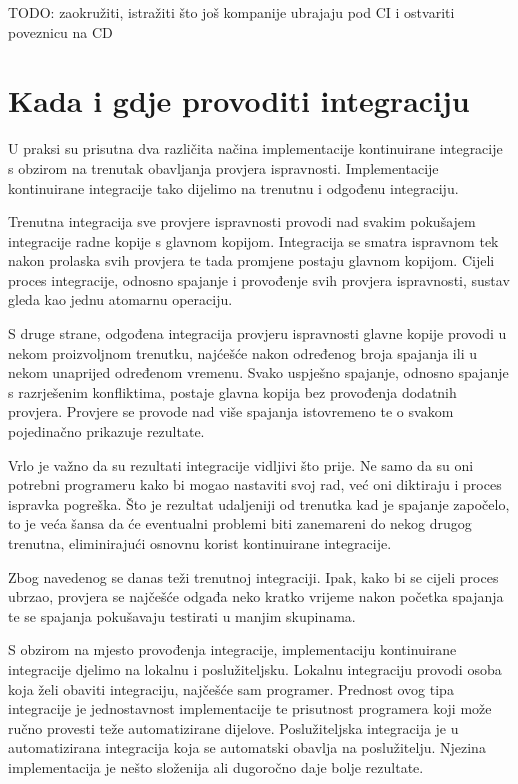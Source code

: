 \documentclass[times, utf8, seminar, numeric]{fer}
\begin{document}
TODO: zaokružiti, istražiti što još kompanije ubrajaju pod CI i ostvariti poveznicu na CD

\section{Kada i gdje provoditi integraciju}
U praksi su prisutna dva različita načina implementacije kontinuirane integracije s obzirom na trenutak obavljanja provjera ispravnosti. Implementacije kontinuirane integracije tako dijelimo na trenutnu i odgođenu integraciju.

Trenutna integracija sve provjere ispravnosti provodi nad svakim pokušajem integracije radne kopije s glavnom kopijom. Integracija se smatra ispravnom tek nakon prolaska svih provjera te tada promjene postaju glavnom kopijom. Cijeli proces integracije, odnosno spajanje i provođenje svih provjera ispravnosti, sustav gleda kao jednu atomarnu operaciju. 

S druge strane, odgođena integracija provjeru ispravnosti glavne kopije provodi u nekom proizvoljnom trenutku, najćešće nakon određenog broja spajanja ili u nekom unaprijed određenom vremenu. Svako uspješno spajanje, odnosno spajanje s razrješenim konfliktima, postaje glavna kopija bez provođenja dodatnih provjera. Provjere se provode nad više spajanja istovremeno te o svakom pojedinačno prikazuje rezultate.

Vrlo je važno da su rezultati integracije vidljivi što prije. Ne samo da su oni potrebni programeru kako bi mogao nastaviti svoj rad, već oni diktiraju i proces ispravka pogreška. Što je rezultat udaljeniji od trenutka kad je spajanje započelo, to je veća šansa da će eventualni problemi biti zanemareni do nekog drugog trenutna, eliminirajući osnovnu korist kontinuirane integracije.

Zbog navedenog se danas teži trenutnoj integraciji. Ipak, kako bi se cijeli proces ubrzao, provjera se najčešće odgađa neko kratko vrijeme nakon početka spajanja te se spajanja pokušavaju testirati u manjim skupinama.

S obzirom na mjesto provođenja integracije, implementaciju kontinuirane integracije djelimo na lokalnu i poslužiteljsku. Lokalnu integraciju provodi osoba koja želi obaviti integraciju, najčešće sam programer. Prednost ovog tipa integracije je jednostavnost implementacije te prisutnost programera koji može ručno provesti teže automatizirane dijelove. Poslužiteljska integracija je u automatizirana integracija koja se automatski obavlja na poslužitelju. Njezina implementacija je nešto složenija ali dugoročno daje bolje rezultate.
\end{document}
